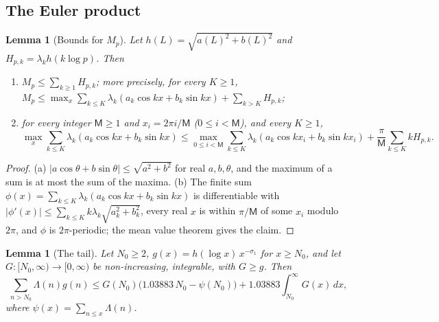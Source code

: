 \documentclass[11pt,reqno]{amsart}
\numberwithin{equation}{section}
\newtheorem{lemma}[theorem]{Lemma}
\theoremstyle{definition}
\theoremstyle{remark}
\begin{document}
\subsection{The Euler product}\label{subsec:euler}

\begin{lemma}[Bounds for $M_p$]\label{lem:Mp}
Let $h(L)=\sqrt{a(L)^2+b(L)^2}$ and $H_{p,k}=\lambda_kh(k\log p)$. Then
\begin{enumerate}[label=(\alph*)]
\item $M_p\le\sum_{k\ge1}H_{p,k}$; more precisely, for every $K\ge1$, $M_p\le\max_x\sum_{k\le K}\lambda_k(a_k\cos kx+b_k\sin kx)+\sum_{k>K}H_{p,k}$;
\item for every integer $\mathsf M\ge1$ and $x_i=2\pi i/\mathsf M$ ($0\le i<\mathsf M$), and every $K\ge1$,
\[
\max_x\sum_{k\le K}\lambda_k(a_k\cos kx+b_k\sin kx)\le\max_{0\le i<\mathsf M}\sum_{k\le K}\lambda_k(a_k\cos kx_i+b_k\sin kx_i)+\frac\pi{\mathsf M}\sum_{k\le K}kH_{p,k}.
\]
\end{enumerate}
\end{lemma}

\begin{proof}
(a) $|a\cos\theta+b\sin\theta|\le\sqrt{a^2+b^2}$ for real $a,b,\theta$, and the maximum of a sum is at most the sum of the maxima. (b) The finite sum $\phi(x)=\sum_{k\le K}\lambda_k(a_k\cos kx+b_k\sin kx)$ is differentiable with $|\phi'(x)|\le\sum_{k\le K}k\lambda_k\sqrt{a_k^2+b_k^2}$, every real $x$ is within $\pi/\mathsf M$ of some $x_i$ modulo $2\pi$, and $\phi$ is $2\pi$-periodic; the mean value theorem gives the claim.
\end{proof}

\begin{lemma}[The tail]\label{lem:tail}
Let $N_0\ge2$, $g(x)=h(\log x)\,x^{-\sigma_1}$ for $x\ge N_0$, and let $G\colon[N_0,\infty)\to[0,\infty)$ be non-increasing, integrable, with $G\ge g$. Then
\begin{equation}
\sum_{n>N_0}\Lambda(n)g(n)\le G(N_0)\bigl(1.03883\,N_0-\psi(N_0)\bigr)+1.03883\int_{N_0}^\infty G(x)\,dx ,
\label{eq:tail_bound}
\end{equation}
where $\psi(x)=\sum_{n\le x}\Lambda(n)$.
\end{lemma}
\end{document}
